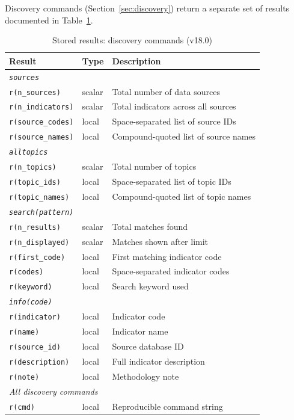 \documentclass[bib]{statapress}
\begin{document}
Discovery commands (Section~\ref{sec:discovery}) return a separate set of
results documented in Table~\ref{tab:stored-discovery}.

\begin{table}[H]
\centering
\caption{Stored results: discovery commands (v18.0)}
\label{tab:stored-discovery}
\begin{tabular}{llp{6.5cm}}
\hline
Result & Type & Description \\
\hline
\multicolumn{3}{l}{\textit{\texttt{sources}}} \\
\texttt{r(n\_sources)} & scalar & Total number of data sources \\
\texttt{r(n\_indicators)} & scalar & Total indicators across all sources \\
\texttt{r(source\_codes)} & local & Space-separated list of source IDs \\
\texttt{r(source\_names)} & local & Compound-quoted list of source names \\
\hline
\multicolumn{3}{l}{\textit{\texttt{alltopics}}} \\
\texttt{r(n\_topics)} & scalar & Total number of topics \\
\texttt{r(topic\_ids)} & local & Space-separated list of topic IDs \\
\texttt{r(topic\_names)} & local & Compound-quoted list of topic names \\
\hline
\multicolumn{3}{l}{\textit{\texttt{search(pattern)}}} \\
\texttt{r(n\_results)} & scalar & Total matches found \\
\texttt{r(n\_displayed)} & scalar & Matches shown after limit \\
\texttt{r(first\_code)} & local & First matching indicator code \\
\texttt{r(codes)} & local & Space-separated indicator codes \\
\texttt{r(keyword)} & local & Search keyword used \\
\hline
\multicolumn{3}{l}{\textit{\texttt{info(code)}}} \\
\texttt{r(indicator)} & local & Indicator code \\
\texttt{r(name)} & local & Indicator name \\
\texttt{r(source\_id)} & local & Source database ID \\
\texttt{r(description)} & local & Full indicator description \\
\texttt{r(note)} & local & Methodology note \\
\hline
\multicolumn{3}{l}{\textit{All discovery commands}} \\
\texttt{r(cmd)} & local & Reproducible command string \\
\hline
\end{tabular}
\end{table}
\end{document}
